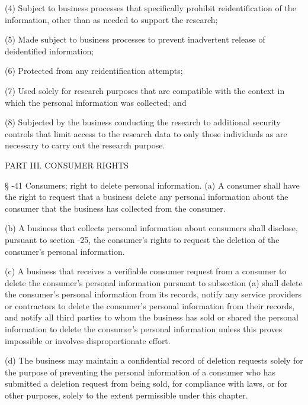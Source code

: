      (4)  Subject to business processes that specifically prohibit reidentification of the information, other than as needed to support the research;

     (5)  Made subject to business processes to prevent inadvertent release of deidentified information;

     (6)  Protected from any reidentification attempts;

     (7)  Used solely for research purposes that are compatible with the context in which the personal information was collected; and

     (8)  Subjected by the business conducting the research to additional security controls that limit access to the research data to only those individuals as are necessary to carry out the research purpose.

PART III.  CONSUMER RIGHTS

     §   -41  Consumers; right to delete personal information.  (a)  A consumer shall have the right to request that a business delete any personal information about the consumer that the business has collected from the consumer.

     (b)  A business that collects personal information about consumers shall disclose, pursuant to section    -25, the consumer's rights to request the deletion of the consumer's personal information.

     (c)  A business that receives a verifiable consumer request from a consumer to delete the consumer's personal information pursuant to subsection (a) shall delete the consumer's personal information from its records, notify any service providers or contractors to delete the consumer's personal information from their records, and notify all third parties to whom the business has sold or shared the personal information to delete the consumer's personal information unless this proves impossible or involves disproportionate effort.

     (d)  The business may maintain a confidential record of deletion requests solely for the purpose of preventing the personal information of a consumer who has submitted a deletion request from being sold, for compliance with laws, or for other purposes, solely to the extent permissible under this chapter.

